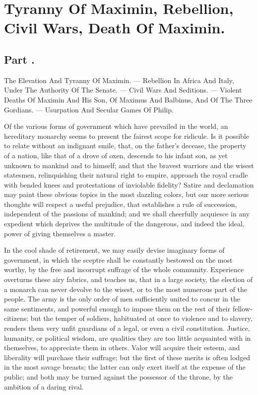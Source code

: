 \chapter{Tyranny Of Maximin, Rebellion, Civil Wars, Death Of Maximin.}
\section{Part \thesection.}

The Elevation And Tyranny Of Maximin. — Rebellion In Africa And
Italy, Under The Authority Of The Senate. — Civil Wars And
Seditions. — Violent Deaths Of Maximin And His Son, Of Maximus And
Balbinus, And Of The Three Gordians. — Usurpation And Secular Games
Of Philip.
\vspace{\onelineskip}

Of the various forms of government which have prevailed in the
world, an hereditary monarchy seems to present the fairest scope
for ridicule. Is it possible to relate without an indignant
smile, that, on the father’s decease, the property of a nation,
like that of a drove of oxen, descends to his infant son, as yet
unknown to mankind and to himself; and that the bravest warriors
and the wisest statesmen, relinquishing their natural right to
empire, approach the royal cradle with bended knees and
protestations of inviolable fidelity? Satire and declamation may
paint these obvious topics in the most dazzling colors, but our
more serious thoughts will respect a useful prejudice, that
establishes a rule of succession, independent of the passions of
mankind; and we shall cheerfully acquiesce in any expedient which
deprives the multitude of the dangerous, and indeed the ideal,
power of giving themselves a master.

In the cool shade of retirement, we may easily devise imaginary
forms of government, in which the sceptre shall be constantly
bestowed on the most worthy, by the free and incorrupt suffrage
of the whole community. Experience overturns these airy fabrics,
and teaches us, that in a large society, the election of a
monarch can never devolve to the wisest, or to the most numerous
part of the people. The army is the only order of men
sufficiently united to concur in the same sentiments, and
powerful enough to impose them on the rest of their
fellow-citizens; but the temper of soldiers, habituated at once
to violence and to slavery, renders them very unfit guardians of
a legal, or even a civil constitution. Justice, humanity, or
political wisdom, are qualities they are too little acquainted
with in themselves, to appreciate them in others. Valor will
acquire their esteem, and liberality will purchase their
suffrage; but the first of these merits is often lodged in the
most savage breasts; the latter can only exert itself at the
expense of the public; and both may be turned against the
possessor of the throne, by the ambition of a daring rival.

